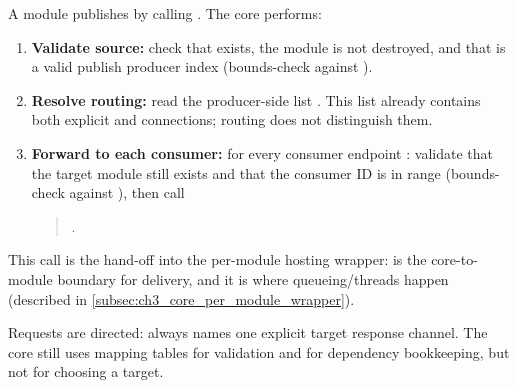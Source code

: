 A module publishes by calling . The core performs:
\begin{enumerate}
    \item \textbf{Validate source:} check that  exists, the module is not destroyed, and that  is a valid publish producer index (bounds-check against ).
    \item \textbf{Resolve routing:} read the producer-side list .
    This list already contains both explicit and  connections; routing does not distinguish them.
    \item \textbf{Forward to each consumer:} for every consumer endpoint :
    validate that the target module still exists and that the consumer ID is in range (bounds-check against ),
    then call
    \begin{quote}
      .
    \end{quote}
\end{enumerate}
This call is the hand-off into the per-module hosting wrapper:  is the core-to-module boundary for delivery, and it is where queueing/threads happen (described in \autoref{subsec:ch3_core_per_module_wrapper}).

Requests are directed:  always names one explicit target response channel.
The core still uses mapping tables for validation and for dependency bookkeeping, but not for choosing a target.

